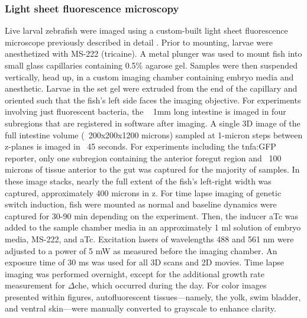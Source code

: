 \subsubsection{Light sheet fluorescence microscopy}
Live larval zebrafish were imaged using a custom-built light sheet fluorescence microscope previously described in detail \cite{jemielita_spatial_2014}. Prior to mounting, larvae were anesthetized with MS-222 (tricaine). A metal plunger was used to mount fish into small glass capillaries containing 0.5\% agarose gel. Samples were then suspended vertically, head up, in a custom imaging chamber containing embryo media and anesthetic. Larvae in the set gel were extruded from the end of the capillary and oriented such that the fish's left side faces the imaging objective. For experiments involving just fluorescent bacteria, the ~ 1mm long intestine is imaged in four subregions that are registered in software after imaging. A single 3D image of the full intestine volume (~200x200x1200 microns) sampled at 1-micron steps between z-planes is imaged in ~45 seconds. For experiments including the tnfa:GFP reporter, only one subregion containing the anterior foregut region and ~100 microns of tissue anterior to the gut was captured for the majority of samples. In these image stacks, nearly the full extent of the fish's left-right width was captured, approximately 400 microns in z. For time lapse imaging of genetic switch induction, fish were mounted as normal and baseline dynamics were captured for 30-90 min depending on the experiment. Then, the inducer aTc was added to the sample chamber media in an approximately 1 ml solution of embryo media, MS-222, and aTc. Excitation lasers of wavelengths 488 and 561 nm were adjusted to a power of 5 mW as measured before the imaging chamber. An exposure time of 30 ms was used for all 3D scans and 2D movies. Time lapse imaging was performed overnight, except for the additional growth rate measurement for $\Delta$che, which occurred during the day. For color images presented within figures, autofluorescent tissues—namely, the yolk, swim bladder, and ventral skin—were manually converted to grayscale to enhance clarity.

